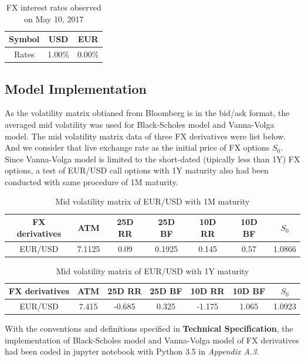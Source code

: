 \begin{table}[htb]
\centering
\caption{{FX interest rates observed on May 10, 2017}}
\begin{tabular}{ccc}
\hline	\hline %
Symbol & USD & EUR   \\ [1ex]%
\hline
Rates & 1.00\% & 0.00\%    \\ [1ex]
\hline
\end{tabular}
\label{table:FX_rates}
\end{table}

\subsection{Model Implementation}
As the volatility matrix obtianed from Bloomberg is in the bid/ask format, the averaged mid volatility was used for Black-Scholes model and Vanna-Volga model. The mid volatility matrix data of three FX derivatives were list below. And we consider that live exchange rate as the initial price of FX options $S_0$.
\newline
\newline
Since Vanna-Volga model is limited to the short-dated (tipically less than 1Y) FX options, a test of EUR/USD call options with 1Y maturity also had been conducted with same procedure of 1M maturity.
\begin{table}[htb]
\centering
\caption{Mid volatility matrix of EUR/USD with 1M maturity}
\begin{tabular}{ccccccc}
\hline \hline
FX derivatives & ATM  & 25D RR  & 25D BF  & 10D RR  & 10D BF & $S_0$\\ [0.5ex]
\hline 
EUR/USD  & 7.1125 &0.09& 0.1925 &0.145 &0.57&1.0866 \\[0.5ex]
\hline
\end{tabular}
\end{table}

\begin{table}[htb]
	\centering
	\caption{Mid volatility matrix of EUR/USD with 1Y maturity}
	\begin{tabular}{ccccccc}
		\hline \hline
		FX derivatives & ATM  & 25D RR  & 25D BF  & 10D RR  & 10D BF & $S_0$\\ [0.5ex]
		\hline 
		EUR/USD  & 7.415&	-0.685&	0.325&	-1.175	&1.065 &1.0923\\[0.5ex]
		\hline
	\end{tabular}
\end{table}

\noindent
With the conventions and definitions specified in \textbf{Technical Specification}, the implementation of Black-Scholes model and Vanna-Volga model of FX derivatives had been coded in jupyter notebook with Python 3.5 in \textit{Appendix A.3}.

